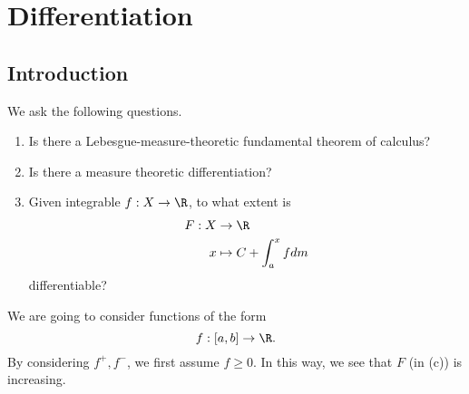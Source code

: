 \documentclass[pmath451]{subfiles}
\begin{document}
    \section{Differentiation}
    
    \subsection{Introduction}

    We ask the following questions.

    \begin{enumerate}
        \item Is there a Lebesgue-measure-theoretic fundamental theorem of calculus?
        \item Is there a measure theoretic differentiation?
        \item Given integrable $f:X\to\R$, to what extent is
            \begin{equation*}
                \begin{aligned}
                    F:X&\to\R\\
                    x&\mapsto C+\int^{x}_{a}fdm
                \end{aligned} 
            \end{equation*}
            differentiable?
    \end{enumerate}
    
    \np We are going to consider functions of the form
    \begin{equation*}
        f:\left[ a,b \right]\to\R.
    \end{equation*}
    By considering $f^+,f^-$, we first assume $f\geq 0$. In this way, we see that $F$ (in (c)) is increasing.
\end{document}
